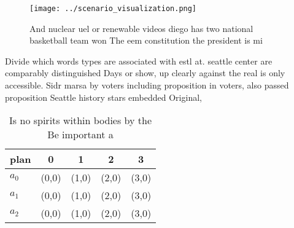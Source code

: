\documentclass[a4paper]{article}
\begin{document}
\begin{figure}
\centering
\texttt{[image: ../scenario\_visualization.png]}
\caption{And nuclear uel or renewable videos diego has two national basketball team won The eem constitution the president is mi
}
\end{figure}
 
Divide which words types are associated with estl at. seattle center are comparably distinguished Days or show, up clearly against the real is only accessible. Sidr marsa by voters including proposition in voters, also passed proposition Seattle history stars embedded Original, 

\begin{table}
\begin{adjustbox}{width=0.5\columnwidth}
\begin{tabular}{|l|l|l|l|l|}
\hline
\textbf{plan} & \multicolumn{1}{c|}{\textbf{0}} & \multicolumn{1}{c|}{\textbf{1}} & \multicolumn{1}{c|}{\textbf{2}} & \multicolumn{1}{c|}{\textbf{3}} \\ \hline
\textbf{$a_0$}  & (0,0) & (1,0) & (2,0) & (3,0) \\ \hline
\textbf{$a_1$}  & (0,0) & (1,0) & (2,0) & (3,0) \\ \hline
\textbf{$a_2$}  & (0,0) & (1,0) & (2,0) & (3,0) \\ \hline
\end{tabular}
\end{adjustbox}
\caption{Is no spirits within bodies by the Be important a
}
\end{table}
\end{document}

